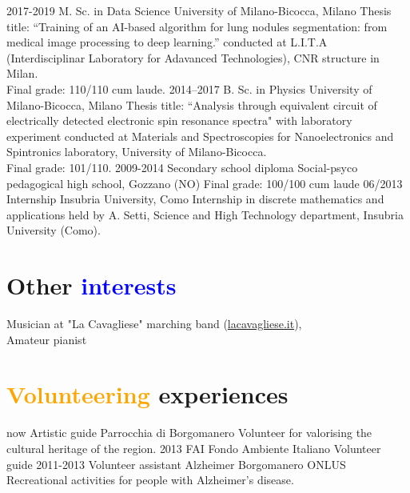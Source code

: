 \documentclass[a4paper]{friggeri-cv}
\begin{document}
\begin{entrylist}
  \entry
    {2017-2019}
    {M. Sc. in Data Science}
    {University of Milano-Bicocca, Milano}
    {Thesis title: ``Training of an AI-based algorithm for lung nodules segmentation: from medical image processing to deep learning.'' conducted at L.I.T.A (Interdisciplinar Laboratory for Adavanced Technologies), CNR structure in Milan.\\
    Final grade: 110/110 cum laude.}
  \entry
    {2014–2017}
    {B. Sc. in Physics}
    {University of Milano-Bicocca, Milano}
    {Thesis title: ``Analysis through equivalent circuit of electrically detected electronic spin resonance spectra" with laboratory experiment conducted at Materials and Spectroscopies for Nanoelectronics and Spintronics laboratory, University of Milano-Bicocca.\\
    Final grade: 101/110. }
  \entry
    {2009-2014}
    {Secondary school diploma}
    {Social-psyco pedagogical high school, Gozzano (NO)}
    {Final grade: 100/100 cum laude}
  \entry
    {06/2013}
    {Internship}
    {Insubria University, Como}
    {Internship in discrete mathematics and applications held by A. Setti, Science and High Technology department, Insubria University (Como).}
\end{entrylist}

\section{Other \textcolor{blue}{interests}}
Musician at "La Cavagliese" marching band (\href{http://www.lacavagliese.it/}{lacavagliese.it}),\\
Amateur pianist
\section{\textcolor{orange}{Volunteering} experiences}
\begin{entrylist}
	\entry
	{now}
	{Artistic guide}
	{Parrocchia di Borgomanero}
	{Volunteer for valorising the cultural heritage of the region.}
	\entry
	{2013}
	{FAI}
	{Fondo Ambiente Italiano}
	{Volunteer guide}
	\entry
	{2011-2013}
	{Volunteer assistant}
	{Alzheimer Borgomanero ONLUS}
	{Recreational activities for people with Alzheimer's disease.}
\end{entrylist}
\end{document}
